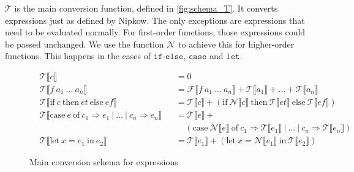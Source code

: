 $\mathcal{T}$ is the main conversion function, defined in \autoref{fig:schema_T}.
It converts expressions just as defined by Nipkow.
The only exceptions are expressions that need to be evaluated normally.
For first-order functions, those expressions could be passed unchanged.
We use the function $\mathcal{N}$ to achieve this for higher-order functions.
This happens in the cases of $\texttt{if-else}$, $\texttt{case}$ and $\texttt{let}$.
\begin{figure}
\begin{align*}
  &\mathcal{T}\llbracket c\rrbracket &&= 0\\
  &\mathcal{T}\llbracket f\ a_{1}\ \dots\ a_{n}\rrbracket &&= \mathcal{F}\llbracket f\ a_{1}\ \dots\ a_{n}\rrbracket + \mathcal{T}\llbracket a_{1}\rrbracket + \dots + \mathcal{T}\llbracket a_{n}\rrbracket\\
  &\mathcal{T}\llbracket \text{if}\ c\ \text{then}\ et\ \text{else}\ ef\rrbracket &&= \mathcal{T}\llbracket c\rrbracket + (\text{if}\ \mathcal{N}\llbracket c\rrbracket\ \text{then}\ \mathcal{T}\llbracket et\rrbracket\ \text{else}\ \mathcal{T}\llbracket ef\rrbracket)\\
  &\mathcal{T}\llbracket \text{case}\ e\ \text{of}\ c_{1} \Rightarrow e_{1}\ |\ \dots\ |\ c_{n}\Rightarrow e_{n}\rrbracket &&= \mathcal{T}\llbracket e\rrbracket + \\
  & &&\ \ \ \ \ (\text{case}\ \mathcal{N}\llbracket e\rrbracket\ \text{of}\ c_{1}\Rightarrow\mathcal{T}\llbracket e_{1}\rrbracket\ |\ \dots\ |\ c_{n} \Rightarrow \mathcal{T}\llbracket e_{n}\rrbracket)\\
  &\mathcal{T}\llbracket \text{let}\ x = e_{1}\ \text{in}\ e_{2}\rrbracket &&= \mathcal{T}\llbracket e_{1}\rrbracket + (\text{let}\ x = \mathcal{N}\llbracket e_{1}\rrbracket\ \text{in}\ \mathcal{T}\llbracket e_{2}\rrbracket)
\end{align*}
  \caption{Main conversion schema for expressions}
  \label{fig:schema_T}
\end{figure}

